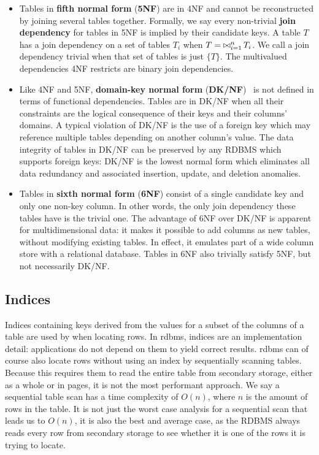 \begin{itemize}
\item Tables in \textbf{fifth normal form} (\textbf{5NF}) are in 4NF and cannot be reconstructed by joining several tables together. Formally, we say every non-trivial \textbf{join dependency} for tables in 5NF is implied by their candidate keys. A table \(T\) has a join dependency on a set of tables \(T_i\) when \(T = \operatorname*{\bowtie}_{i=1}^{n} T_i\). We call a join dependency trivial when that set of tables is just \(\{ T \}\). The multivalued dependencies 4NF restricts are binary join dependencies.
\item Like 4NF and 5NF, \textbf{domain-key normal form} (\textbf{DK/NF})~\citep{DBLP:journals/tods/Fagin81} is not defined in terms of functional dependencies. Tables are in DK/NF when all their constraints are the logical consequence of their keys and their columns' domains. A typical violation of DK/NF is the use of a foreign key which may reference multiple tables depending on another column's value. The data integrity of tables in DK/NF can be preserved by any RDBMS which supports foreign keys\thinspace: DK/NF is the lowest normal form which eliminates all data redundancy and associated insertion, update, and deletion anomalies.
\item Tables in \textbf{sixth normal form} (\textbf{6NF}) consist of a single candidate key and only one non-key column. In other words, the only join dependency these tables have is the trivial one. The advantage of 6NF over DK/NF is apparent for multidimensional data: it makes it possible to add columns as new tables, without modifying existing tables. In effect, it emulates part of a wide column store with a relational database. Tables in 6NF also trivially satisfy 5NF, but not necessarily DK/NF.
\end{itemize}

\subsection{Indices}%

Indices containing keys derived from the values for a subset of the columns of a table are used by  when locating rows.
In \acrshort{rdbms}, indices are an implementation detail\thinspace: applications do not depend on them to yield correct results.
\Acrshort{rdbms} can of course also locate rows without using an index by sequentially scanning tables.
Because this requires them to read the entire table from secondary storage, either as a whole or in pages, it is not the most performant approach.
We say a sequential table scan has a time complexity of \(O(n)\), where \(n\) is the amount of rows in the table.
It is not just the worst case analysis for a sequential scan that leads us to \(O(n)\), it is also the best and average case, as the RDBMS always reads every row from secondary storage to see whether it is one of the rows it is trying to locate.


